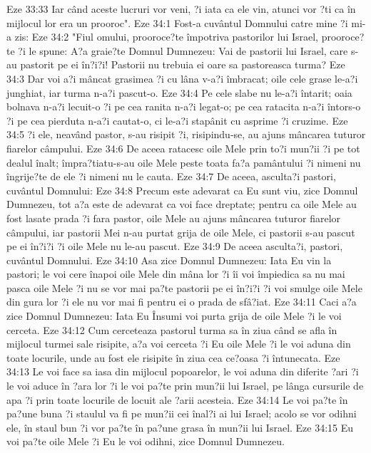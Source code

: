 Eze 33:33  Iar când aceste lucruri vor veni, ?i iata ca ele vin, atunci vor ?ti ca în mijlocul lor era un prooroc".
Eze 34:1  Fost-a cuvântul Domnului catre mine ?i mi-a zis:
Eze 34:2  "Fiul omului, prooroce?te împotriva pastorilor lui Israel, prooroce?te ?i le spune: A?a graie?te Domnul Dumnezeu: Vai de pastorii lui Israel, care s-au pastorit pe ei în?i?i! Pastorii nu trebuia ei oare sa pastoreasca turma?
Eze 34:3  Dar voi a?i mâncat grasimea ?i cu lâna v-a?i îmbracat; oile cele grase le-a?i junghiat, iar turma n-a?i pascut-o.
Eze 34:4  Pe cele slabe nu le-a?i întarit; oaia bolnava n-a?i lecuit-o ?i pe cea ranita n-a?i legat-o; pe cea ratacita n-a?i întors-o ?i pe cea pierduta n-a?i cautat-o, ci le-a?i stapânit cu asprime ?i cruzime.
Eze 34:5  ?i ele, neavând pastor, s-au risipit ?i, risipindu-se, au ajuns mâncarea tuturor fiarelor câmpului.
Eze 34:6  De aceea ratacesc oile Mele prin to?i mun?ii ?i pe tot dealul înalt; împra?tiatu-s-au oile Mele peste toata fa?a pamântului ?i nimeni nu îngrije?te de ele ?i nimeni nu le cauta.
Eze 34:7  De aceea, asculta?i pastori, cuvântul Domnului:
Eze 34:8  Precum este adevarat ca Eu sunt viu, zice Domnul Dumnezeu, tot a?a este de adevarat ca voi face dreptate; pentru ca oile Mele au fost lasate prada ?i fara pastor, oile Mele au ajuns mâncarea tuturor fiarelor câmpului, iar pastorii Mei n-au purtat grija de oile Mele, ci pastorii s-au pascut pe ei în?i?i ?i oile Mele nu le-au pascut.
Eze 34:9  De aceea asculta?i, pastori, cuvântul Domnului.
Eze 34:10  Asa zice Domnul Dumnezeu: Iata Eu vin la pastori; le voi cere înapoi oile Mele din mâna lor ?i îi voi împiedica sa nu mai pasca oile Mele ?i nu se vor mai pa?te pastorii pe ei în?i?i ?i voi smulge oile Mele din gura lor ?i ele nu vor mai fi pentru ei o prada de sfâ?iat.
Eze 34:11  Caci a?a zice Domnul Dumnezeu: Iata Eu Însumi voi purta grija de oile Mele ?i le voi cerceta.
Eze 34:12  Cum cerceteaza pastorul turma sa în ziua când se afla în mijlocul turmei sale risipite, a?a voi cerceta ?i Eu oile Mele ?i le voi aduna din toate locurile, unde au fost ele risipite în ziua cea ce?oasa ?i întunecata.
Eze 34:13  Le voi face sa iasa din mijlocul popoarelor, le voi aduna din diferite ?ari ?i le voi aduce în ?ara lor ?i le voi pa?te prin mun?ii lui Israel, pe lânga cursurile de apa ?i prin toate locurile de locuit ale ?arii acesteia.
Eze 34:14  Le voi pa?te în pa?une buna ?i staulul va fi pe mun?ii cei înal?i ai lui Israel; acolo se vor odihni ele, în staul bun ?i vor pa?te în pa?une grasa în mun?ii lui Israel.
Eze 34:15  Eu voi pa?te oile Mele ?i Eu le voi odihni, zice Domnul Dumnezeu.
